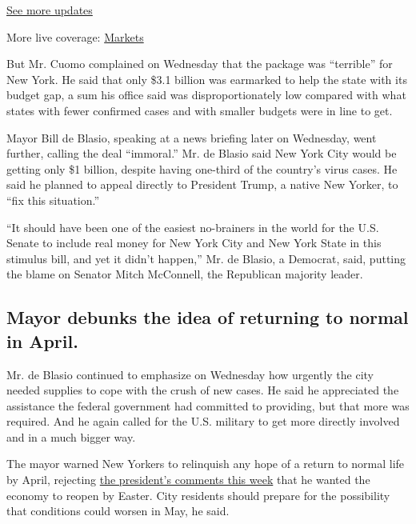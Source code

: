 \href{https://www.nytimes3xbfgragh.onion/2020/09/11/world/covid-19-coronavirus.html?action=click\&pgtype=Article\&state=default\&region=MAIN_CONTENT_1\&context=storylines_live_updates}{See
more updates}

More live coverage:
\href{https://www.nytimes3xbfgragh.onion/live/2020/09/11/business/stock-market-today-coronavirus?action=click\&pgtype=Article\&state=default\&region=MAIN_CONTENT_1\&context=storylines_live_updates}{Markets}

But Mr. Cuomo complained on Wednesday that the package was ``terrible''
for New York. He said that only \$3.1 billion was earmarked to help the
state with its budget gap, a sum his office said was disproportionately
low compared with what states with fewer confirmed cases and with
smaller budgets were in line to get.

Mayor Bill de Blasio, speaking at a news briefing later on Wednesday,
went further, calling the deal ``immoral.'' Mr. de Blasio said New York
City would be getting only \$1 billion, despite having one-third of the
country's virus cases. He said he planned to appeal directly to
President Trump, a native New Yorker, to ``fix this situation.''

``It should have been one of the easiest no-brainers in the world for
the U.S. Senate to include real money for New York City and New York
State in this stimulus bill, and yet it didn't happen,'' Mr. de Blasio,
a Democrat, said, putting the blame on Senator Mitch McConnell, the
Republican majority leader.

\hypertarget{mayor-debunks-the-idea-of-returning-to-normal-in-april}{%
\subsection{Mayor debunks the idea of returning to normal in
April.}\label{mayor-debunks-the-idea-of-returning-to-normal-in-april}}

Mr. de Blasio continued to emphasize on Wednesday how urgently the city
needed supplies to cope with the crush of new cases. He said he
appreciated the assistance the federal government had committed to
providing, but that more was required. And he again called for the U.S.
military to get more directly involved and in a much bigger way.

The mayor warned New Yorkers to relinquish any hope of a return to
normal life by April, rejecting
\href{https://www.nytimes3xbfgragh.onion/2020/03/24/us/politics/trump-coronavirus-easter.html}{the
president's comments this week} that he wanted the economy to reopen by
Easter. City residents should prepare for the possibility that
conditions could worsen in May, he said.

